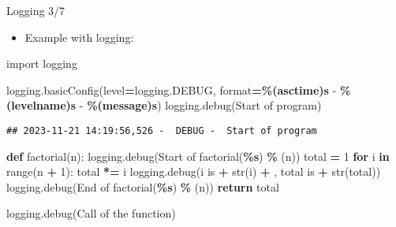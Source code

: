 \documentclass[
  8pt,
  ignorenonframetext,
]{beamer}
\newenvironment{Shaded}{\begin{snugshade}}{\end{snugshade}}
\newcommand{\BuiltInTok}[1]{#1}
\newcommand{\ControlFlowTok}[1]{\textcolor[rgb]{0.13,0.29,0.53}{\textbf{#1}}}
\newcommand{\DecValTok}[1]{\textcolor[rgb]{0.00,0.00,0.81}{#1}}
\newcommand{\ImportTok}[1]{#1}
\newcommand{\KeywordTok}[1]{\textcolor[rgb]{0.13,0.29,0.53}{\textbf{#1}}}
\newcommand{\NormalTok}[1]{#1}
\newcommand{\OperatorTok}[1]{\textcolor[rgb]{0.81,0.36,0.00}{\textbf{#1}}}
\newcommand{\SpecialCharTok}[1]{\textcolor[rgb]{0.81,0.36,0.00}{\textbf{#1}}}
\newcommand{\StringTok}[1]{\textcolor[rgb]{0.31,0.60,0.02}{#1}}
\providecommand{\tightlist}{%
  \setlength{\itemsep}{0pt}\setlength{\parskip}{0pt}}
\begin{document}
\begin{frame}[fragile]{Logging 3/7}
\protect\hypertarget{logging-37}{}
\begin{itemize}
\tightlist
\item
  Example with logging:
\end{itemize}

\begin{Shaded}
\begin{Highlighting}[]
\ImportTok{import}\NormalTok{ logging}

\NormalTok{logging.basicConfig(level}\OperatorTok{=}\NormalTok{logging.DEBUG, }\BuiltInTok{format}\OperatorTok{=}\StringTok{\textquotesingle{}}\SpecialCharTok{\%(asctime)s}\StringTok{ {-}  }\SpecialCharTok{\%(levelname)s}\StringTok{ {-}  }\SpecialCharTok{\%(message)s}\StringTok{\textquotesingle{}}\NormalTok{)}
\NormalTok{logging.debug(}\StringTok{\textquotesingle{}Start of program\textquotesingle{}}\NormalTok{)}
\end{Highlighting}
\end{Shaded}

\begin{verbatim}
## 2023-11-21 14:19:56,526 -  DEBUG -  Start of program
\end{verbatim}

\begin{Shaded}
\begin{Highlighting}[]
\KeywordTok{def}\NormalTok{ factorial(n):}
\NormalTok{    logging.debug(}\StringTok{\textquotesingle{}Start of factorial(}\SpecialCharTok{\%s}\StringTok{)\textquotesingle{}}  \OperatorTok{\%}\NormalTok{ (n))}
\NormalTok{    total }\OperatorTok{=} \DecValTok{1}
    \ControlFlowTok{for}\NormalTok{ i }\KeywordTok{in} \BuiltInTok{range}\NormalTok{(n }\OperatorTok{+} \DecValTok{1}\NormalTok{):}
\NormalTok{        total }\OperatorTok{*=}\NormalTok{ i}
\NormalTok{        logging.debug(}\StringTok{\textquotesingle{}i is \textquotesingle{}} \OperatorTok{+} \BuiltInTok{str}\NormalTok{(i) }\OperatorTok{+} \StringTok{\textquotesingle{}, total is \textquotesingle{}} \OperatorTok{+} \BuiltInTok{str}\NormalTok{(total))}
\NormalTok{    logging.debug(}\StringTok{\textquotesingle{}End of factorial(}\SpecialCharTok{\%s}\StringTok{)\textquotesingle{}}  \OperatorTok{\%}\NormalTok{ (n))}
    \ControlFlowTok{return}\NormalTok{ total}

\NormalTok{logging.debug(}\StringTok{\textquotesingle{}Call of the function\textquotesingle{}}\NormalTok{)}
\end{Highlighting}
\end{Shaded}


\end{frame}
\end{document}
